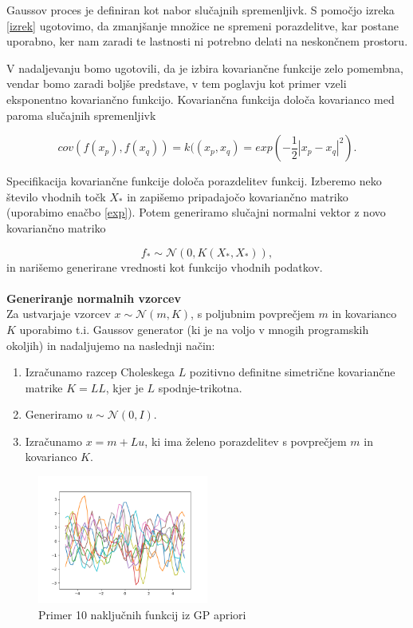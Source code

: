 \documentclass[12pt,a4paper]{amsart}
\theoremstyle{definition} %
\theoremstyle{plain} %
\begin{document}
\opomba Gaussov proces je definiran kot nabor slučajnih spremenljivk. S pomočjo izreka \ref{izrek} ugotovimo, da
zmanjšanje množice ne spremeni porazdelitve, kar postane uporabno, ker nam zaradi te lastnosti ni potrebno delati na neskončnem prostoru. 

V nadaljevanju bomo ugotovili, da je izbira kovariančne funkcije zelo pomembna, vendar bomo zaradi boljše predstave,
v tem poglavju kot primer vzeli eksponentno kovariančno funkcijo. Kovariančna funkcija določa kovarianco med paroma slučajnih spremenljivk

\begin{equation} \label{exp}
cov(f(x_{p}), f(x_{q})) = k((x_{p},x_{q}) = exp( - \frac{1}{2} |x_{p} - x_{q}|^2).
\end{equation}

Specifikacija kovariančne funkcije določa porazdelitev funkcij. 
Izberemo neko število vhodnih točk $X_{*}$ in zapišemo pripadajočo kovariančno matriko (uporabimo enačbo \ref{exp}).
Potem generiramo slučajni normalni vektor z novo kovariančno matriko

\begin{equation} 
f_{*} \sim \mathcal{N}(0, K(X_{*}, X_{*})),
\end{equation}
in narišemo generirane vrednosti kot funkcijo vhodnih podatkov. \\
~\\
\textbf{Generiranje normalnih vzorcev} \\
Za ustvarjaje vzorcev $ x \sim \mathcal{N}(m,K) $, s poljubnim povprečjem $m$ in kovarianco $K$ uporabimo t.i. Gaussov generator (ki je na voljo v mnogih programskih okoljih) in nadaljujemo na naslednji način: 
\begin{enumerate}
\item Izračunamo razcep Choleskega $L$ pozitivno definitne simetrične kovariančne matrike $K=LL$, kjer je $L$ spodnje-trikotna. 
\item Generiramo $ u \sim \mathcal{N}(0,I). $
\item Izračunamo $x= m+ Lu$, ki ima želeno porazdelitev s povprečjem $m$ in kovarianco $K$. 
\end{enumerate}

\begin{figure}[h]
\caption{Primer 10 naključnih funkcij iz GP apriori}
\centering
\includegraphics[width=0.5\textwidth]{10prior}
\end{figure}
\end{document}
